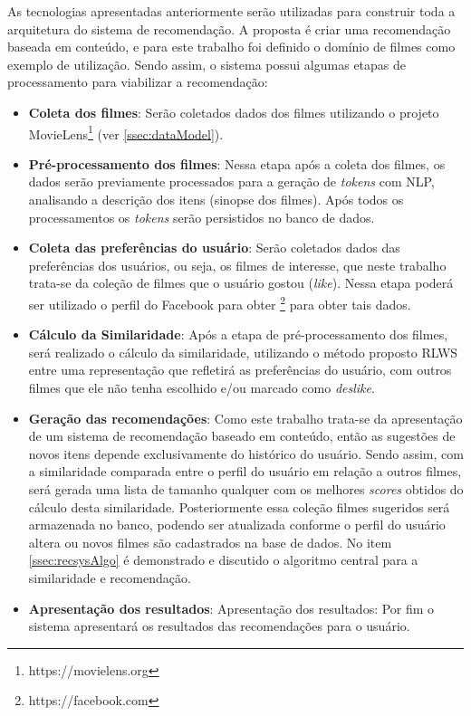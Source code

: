As tecnologias apresentadas anteriormente serão utilizadas para construir toda a arquitetura do sistema de recomendação. A proposta é criar uma recomendação baseada em conteúdo, e para este trabalho foi definido o domínio de filmes como exemplo de utilização. Sendo assim, o sistema possui algumas etapas de processamento para viabilizar a recomendação:

\begin{itemize}
	\item{\textbf{Coleta dos filmes}: Serão coletados dados dos filmes utilizando o projeto MovieLens\footnote{https://movielens.org} (ver \ref{ssec:dataModel}).}
	
	\item{\textbf{Pré-processamento dos filmes}: Nessa etapa após a coleta dos filmes, os dados serão previamente processados para a geração de \textit{tokens} com \ac{NLP}, analisando a descrição dos itens (sinopse dos filmes). Após todos os processamentos os \textit{tokens} serão persistidos no banco de dados.}
	
	\item{\textbf{Coleta das preferências do usuário}: Serão coletados dados das preferências dos usuários, ou seja, os filmes de interesse, que neste trabalho trata-se da coleção de filmes que o usuário gostou (\textit{like}). Nessa etapa poderá ser utilizado o perfil do Facebook para obter \footnote{https://facebook.com} para obter tais dados.}

	\item{\textbf{Cálculo da Similaridade}: Após a etapa de pré-processamento dos filmes, será realizado o cálculo da similaridade, utilizando o método proposto \ac{RLWS} entre uma representação que refletirá as preferências do usuário, com outros filmes que ele não tenha escolhido e/ou marcado como \textit{deslike}.}
	
	\item{\textbf{Geração das recomendações}: Como este trabalho trata-se da apresentação de um sistema de recomendação baseado em conteúdo, então as sugestões de novos itens depende exclusivamente do histórico do usuário. Sendo assim, com a similaridade comparada entre o perfil do usuário em relação a outros filmes, será gerada uma lista de tamanho qualquer com os melhores \textit{scores} obtidos do cálculo desta similaridade. Posteriormente essa coleção filmes sugeridos será armazenada no banco, podendo ser atualizada conforme o perfil do usuário altera ou novos filmes são cadastrados na base de dados. No item \ref{ssec:recsysAlgo} é demonstrado e discutido o algoritmo central para a similaridade e recomendação.}
	
	\item{\textbf{Apresentação dos resultados}: Apresentação dos resultados: Por fim o sistema apresentará os resultados das recomendações para o usuário.}		
\end{itemize}

